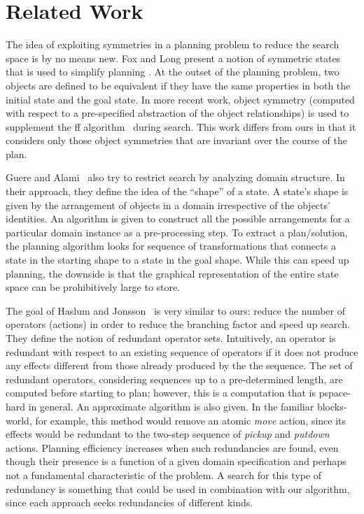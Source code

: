 



\section{Related Work}


The idea of exploiting symmetries in a planning problem to
reduce the search space is by no means new.
Fox and Long present a notion of symmetric states that is used to
simplify planning .  At the outset
of the planning problem, two objects are
defined to be equivalent if they have the same
properties in both the initial state and the goal state. In more recent work, object symmetry
(computed with respect to a pre-specified abstraction of the object
relationships) is used to supplement the {\sc ff}
algorithm~\cite{hoffmann01jair} during search.  This work differs from
ours in that it considers
only those object symmetries that are invariant over the course of the plan.

Guere and Alami~ also try to restrict search by
analyzing domain structure. In their approach, they define the idea of
the ``shape'' of a state. A state's shape is given by the
arrangement of objects in a domain irrespective of the objects' identities.
An algorithm is given to construct
all the possible arrangements for a particular domain instance as a
pre-processing step.  To extract a
plan/solution, the planning algorithm looks for sequence of
transformations
that connects a state in the
starting shape to a state in the goal shape. While this can
speed up planning, the downside is
that the graphical representation of the entire state space can be
prohibitively large to store. 

The goal of Haslum and Jonsson~ is very
similar to ours: reduce the number of operators (actions) in order to reduce the
branching factor and speed up search. They define the notion of
redundant operator sets. Intuitively, an operator is redundant with
respect to an
existing sequence of operators if it does not produce any effects
different from those already produced by the
the sequence.  The set of redundant operators, considering sequences
up to a pre-determined length, are computed before
starting to plan; however, this is a computation that is 
{\sc pspace}-hard in general. An approximate algorithm is also given.
In the familiar blocks-world, for example, this method would remove an atomic
\emph{move} action, since its effects would be redundant
to the two-step sequence of
\emph{pickup} and \emph{putdown} actions.
Planning efficiency increases when such redundancies are found, even though
their presence is a function of a given domain specification and
perhaps not a fundamental characteristic of the problem.  A
search for this type of redundancy is something that could be used in
combination with our algorithm, since each approach seeks redundancies of
different kinds.

